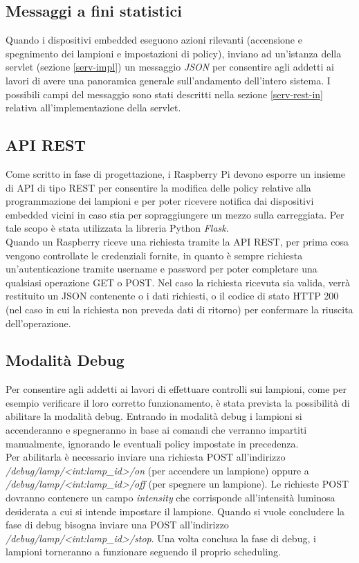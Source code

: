 
\newpage

\subsection{Messaggi a fini statistici}
Quando i dispositivi embedded eseguono azioni rilevanti (accensione e spegnimento dei lampioni e impostazioni di policy), inviano ad un'istanza della servlet (sezione \ref{serv-impl}) un messaggio \textit{JSON} per consentire agli addetti ai lavori di avere una panoramica generale sull'andamento dell'intero sistema.
I possibili campi del messaggio sono stati descritti nella sezione \ref{serv-rest-in} relativa all'implementazione della servlet.

\subsection{API REST}
Come scritto in fase di progettazione, i Raspberry Pi devono esporre un insieme di API di tipo REST per consentire la modifica delle policy relative alla programmazione dei lampioni e per poter ricevere notifica dai dispositivi embedded vicini in caso stia per sopraggiungere un mezzo sulla carreggiata.
Per tale scopo è stata utilizzata la libreria Python \textit{Flask}.
\\Quando un Raspberry riceve una richiesta tramite la API REST, per prima cosa vengono controllate le credenziali fornite, in quanto è sempre richiesta un'autenticazione tramite username e password per poter completare una qualsiasi operazione GET o POST.
Nel caso la richiesta ricevuta sia valida, verrà restituito un JSON contenente o i dati richiesti, o il codice di stato HTTP 200 (nel caso in cui la richiesta non preveda dati di ritorno) per confermare la riuscita dell'operazione.

\subsection{Modalità Debug}
Per consentire agli addetti ai lavori di effettuare controlli sui lampioni, come per esempio verificare il loro corretto funzionamento, è stata prevista la possibilità di abilitare la modalità debug.
Entrando in modalità debug i lampioni si accenderanno e spegneranno in base ai comandi che verranno impartiti manualmente, ignorando le eventuali policy impostate in precedenza.
\\Per abilitarla è necessario inviare una richiesta POST all'indirizzo \textit{/debug/lamp/<int:lamp\_id>/on} (per accendere un lampione) oppure a \textit{/debug/lamp/<int:lamp\_id>/off} (per spegnere un lampione).
Le richieste POST dovranno contenere un campo \textit{intensity} che corrisponde all'intensità luminosa desiderata a cui si intende impostare il lampione.
Quando si vuole concludere la fase di debug bisogna inviare una POST all'indirizzo \textit{/debug/lamp/<int:lamp\_id>/stop}.
Una volta conclusa la fase di debug, i lampioni torneranno a funzionare seguendo il proprio scheduling.

